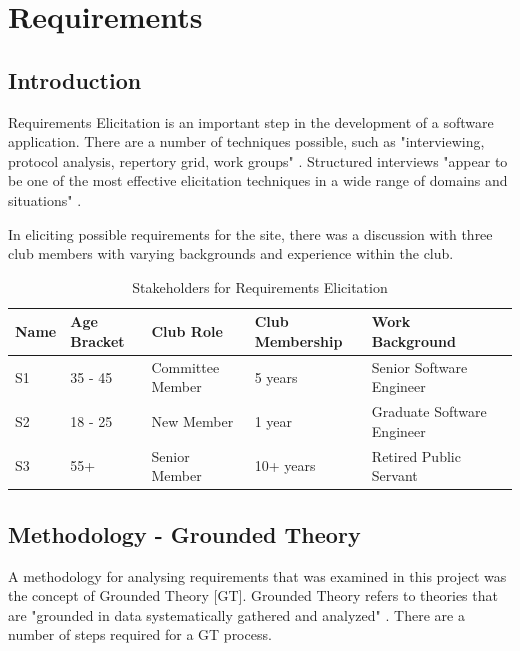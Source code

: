 \chapter{Requirements}
\label{requirements}

\section{Introduction}

Requirements Elicitation is an important step in the development of a software application. There are a number of techniques possible, such as "interviewing, protocol analysis, repertory grid, work groups" \parencite{davis2006effectiveness}. Structured interviews "appear to be one of the most effective elicitation techniques in a wide range of domains and situations" \parencite{davis2006effectiveness}. 

In eliciting possible requirements for the site, there was a discussion with three club members with varying backgrounds and experience within the club.

\begin{table}[H]
\caption{Stakeholders for Requirements Elicitation}
\begin{center}
    \begin{tabular}{ | l | l | l | l | l| p{5cm} |}
    \hline
    Name & Age Bracket & Club Role & Club Membership & Work Background \\ \hline
	S1 & 35 - 45& Committee Member & 5 years & Senior Software Engineer \\ \hline
	S2 & 18 - 25 & New Member & 1 year & Graduate Software Engineer \\ \hline
	S3 & 55+ & Senior Member & 10+ years & Retired Public Servant \\ \hline
    \end{tabular}
\end{center}
\label{fig:userelicit}
\end{table}

\section{Methodology - Grounded Theory}

A methodology for analysing requirements that was examined in this project was the concept of Grounded Theory [GT]. Grounded Theory refers to theories that are "grounded in data systematically gathered and analyzed" \parencite{straussgrounded}. There are a number of steps required for a GT process.

